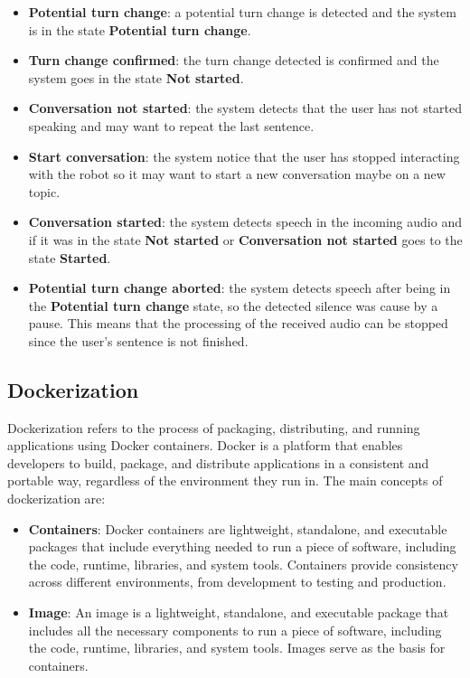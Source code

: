 \documentclass[../main.tex]{subfiles}
\begin{document}
\begin{itemize}
    \item \textbf{Potential turn change}: a potential turn change is detected and the system is in the state \textbf{Potential turn change}.
    \item \textbf{Turn change confirmed}: the turn change detected is confirmed and the system goes in the state \textbf{Not started}.
    \item \textbf{Conversation not started}: the system detects that the user has not started speaking and may want to repeat the last sentence.
    \item \textbf{Start conversation}: the system notice that the user has stopped interacting with the robot so it may want to start a new conversation maybe on a new topic.
    \item \textbf{Conversation started}: the system detects speech in the incoming audio and if it was in the state \textbf{Not started} or \textbf{Conversation not started} goes to the state \textbf{Started}.
    \item \textbf{Potential turn change aborted}: the system detects speech after being in the \textbf{Potential turn change} state, so the detected silence was cause by a pause. This means that the processing of the received audio can be stopped since the user's sentence is not finished.
\end{itemize}

\clearpage

\subsection{Dockerization}

Dockerization refers to the process of packaging, distributing, and running applications using Docker containers. Docker is a platform that enables developers to build, package, and distribute applications in a consistent and portable way, regardless of the environment they run in. The main concepts of dockerization are:

\begin{itemize}
    \item \textbf{Containers}: Docker containers are lightweight, standalone, and executable packages that include everything needed to run a piece of software, including the code, runtime, libraries, and system tools. Containers provide consistency across different environments, from development to testing and production.
    \item \textbf{Image}: An image is a lightweight, standalone, and executable package that includes all the necessary components to run a piece of software, including the code, runtime, libraries, and system tools. Images serve as the basis for containers.
\end{itemize}
\end{document}
